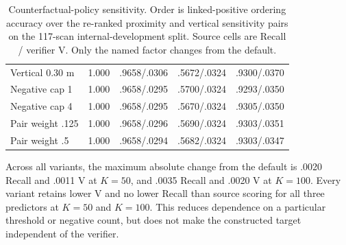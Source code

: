 \begin{table}[t]
{\begin{tabular}{lrrrr}
Vertical 0.30 m & 1.000 & .9658/.0306 & .5672/.0324 & .9300/.0370 \\
Negative cap 1 & 1.000 & .9658/.0295 & .5700/.0324 & .9293/.0350 \\
Negative cap 4 & 1.000 & .9658/.0295 & .5670/.0324 & .9305/.0350 \\
Pair weight .125 & 1.000 & .9658/.0296 & .5690/.0324 & .9303/.0351 \\
Pair weight .5 & 1.000 & .9658/.0294 & .5682/.0324 & .9303/.0347 \\
\bottomrule
\end{tabular}
}
\caption{Counterfactual-policy sensitivity. Order is linked-positive ordering
accuracy over the re-ranked proximity and vertical sensitivity pairs on the
117-scan internal-development split. Source cells are Recall / verifier V. Only
the named factor changes from the default.}
\label{tab:counterfactual-sensitivity}
\end{table}

Across all variants, the maximum absolute change from the default is .0020
Recall and .0011 V at $K=50$, and .0035 Recall and .0020 V at $K=100$.
Every variant retains lower V and no lower Recall than source scoring for all
three predictors at $K=50$ and $K=100$. This reduces dependence
on a particular threshold or negative count, but does not make the constructed
target independent of the verifier.
